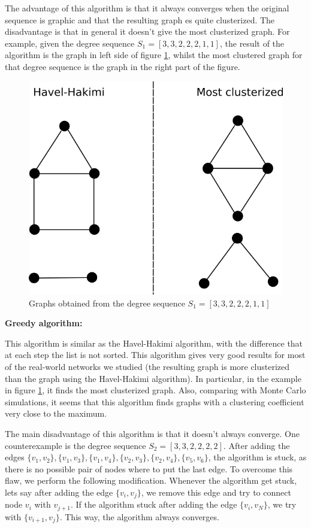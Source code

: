\documentclass{article}
\begin{document}
The advantage of this algorithm is that it always converges when the original sequence is graphic and that the resulting graph es quite clusterized. The disadvantage is that in general it doesn't give the most clusterized graph. For example, given the degree sequence $S_1 = [3, 3, 2, 2, 2, 1, 1]$, the result of the algorithm is the graph in left side of figure \ref{fig:graph_3322211}, whilst the most clustered graph for that degree sequence is the graph in the right part of the figure.

\begin{figure}[ht!]
\centering
\includegraphics[scale=0.8]{./figs/graph_3322211.png}
\caption{Graphs obtained from the degree sequence $S_1 = [3, 3, 2, 2, 2, 1, 1]$}
\label{fig:graph_3322211}
\end{figure}

{\bf Greedy algorithm:}

This algorithm is similar as the Havel-Hakimi algorithm, with the difference that at each step the list is not sorted. This algorithm gives very good results for most of the real-world networks we studied (the resulting graph is more clusterized than the graph using the Havel-Hakimi algorithm). In particular, in the example in figure \ref{fig:graph_3322211}, it finds the most clusterized graph. Also, comparing with Monte Carlo simulations, it seems that this algorithm finds graphs with a clustering coefficient very close to the maximum. 

The main disadvantage of this algorithm is that it doesn't always converge. One counterexample is the degree sequence $S_2 = [3, 3, 2, 2, 2, 2]$. After adding the edges $\lbrace v_1, v_2 \rbrace, \lbrace v_1, v_3 \rbrace, \lbrace v_1, v_4 \rbrace, \lbrace v_2, v_3 \rbrace, \lbrace v_2, v_4 \rbrace, \lbrace v_5, v_6 \rbrace$, the algorithm is stuck, as there is no possible pair of nodes where to put the last edge. To overcome this flaw, we  perform the following modification. Whenever the algorithm get stuck, lets say after adding the edge $\lbrace v_i, v_j \rbrace$, we remove this edge and try to connect node $v_i$ with $v_{j+1}$. If the algorithm stuck after adding the edge $\lbrace v_i, v_N \rbrace$, we try with $\lbrace v_{i+1}, v_j \rbrace$. This way, the algorithm always converges. 
\end{document}
